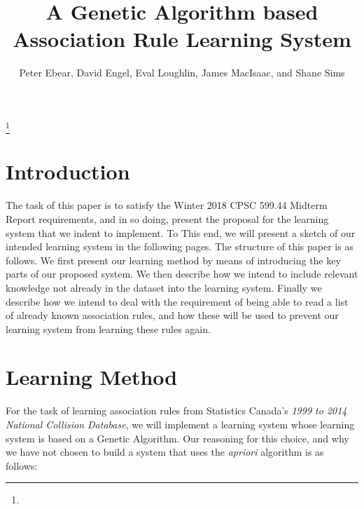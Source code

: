 \documentclass{amsart}
\theoremstyle{definition}
\theoremstyle{remark}
\numberwithin{equation}{section}
\begin{document}



\title{A Genetic Algorithm based Association Rule Learning System}


\author{Peter Ebear, David Engel, Eval Loughlin, James MacIsaac, and Shane Sims }
\address{}
\curraddr{}
\thanks{}




\keywords{}

\date{}

\dedicatory{}

\maketitle

\section{Introduction}

The task of this paper is to satisfy the Winter 2018 CPSC 599.44 Midterm Report requirements, and in so doing, present the proposal for the learning system that we indent to implement. To This end, we will present a sketch of our intended learning system in the following pages. The structure of this paper is as follows. We first present our learning method by means of introducing the key parts of our proposed system. We then describe how we intend to include relevant knowledge not already in the dataset into the learning system. Finally we describe how we intend to deal with the requirement of being able to read a list of already known association rules, and how these will be used to prevent our learning system from learning these rules again.

\section{Learning Method}

For the task of learning association rules from Statistics Canada's \textit{1999 to 2014 National Collision Database}, we will implement a learning system whose learning system is based on a Genetic Algorithm. Our reasoning for this choice, and why we have not chosen to build a system that uses the \textit{apriori} algorithm is as follows:\newline
\end{document}
